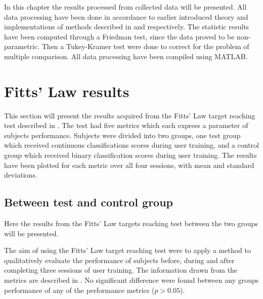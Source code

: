 
In this chapter the results processed from collected data will be presented. All data processing have been done in accordance to earlier introduced theory and implementations of methods described in  and  respectively. The statistic results have been computed through a Friedman test, since the data proved to be non-parametric. Then a Tukey-Kramer test were done to correct for the problem of multiple comparison. All data processing have been compiled using MATLAB.


\section{Fitts' Law results} \label{sec:R:fitts}
This section will present the results acquired from the Fitts' Law target reaching test described in . The test had five metrics which each express a parameter of subjects performance. Subjects were divided into two groups, one test group which received continuous classifications scores during user training, and a control group which received binary classification scores during user training. The results have been plotted for each metric over all four sessions, with mean and standard deviations.
 

\subsection{Between test and control group}
Here the results from the Fitts' Law targets reaching test between the two groups will be presented.

%

The aim of using the Fitts' Law target reaching test were to apply a method to qualitatively evaluate the performance of subjects before, during and after completing three sessions of user training. The information drawn from the metrics are described in . No significant difference were found between any groups performance of any of the performance metrics ($p > 0.05$).  %

